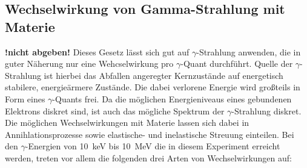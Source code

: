 \subsection{Wechselwirkung von Gamma-Strahlung mit Materie}
\textbf{!nicht abgeben!}
Dieses Gesetz lässt sich gut auf $\gamma$-Strahlung anwenden, die in guter Näherung
nur eine Wehcselwirkung pro $\gamma$-Quant durchführt. Quelle der $\gamma$-Strahlung ist
hierbei das Abfallen angeregter Kernzustände auf energetisch stabilere, energieärmere
Zustände. Die dabei verlorene Energie wird großteils in Form eines $\gamma$-Quants frei.
Da die möglichen Energieniveaus eines gebundenen Elektrons diskret sind, ist auch das
mögliche Spektrum der $\gamma$-Strahlung diskret. Die möglichen Wechselwirkungen mit Materie
lassen sich dabei in Annihlationsprozesse sowie elastische- und inelastische Streuung
einteilen. Bei den $\gamma$-Energien von
\SI{10}{\kilo\electronvolt} bis \SI{10}{\mega\electronvolt} die in diesem Experiment
erreicht werden, treten vor allem die folgenden drei Arten von Wechselwirkungen auf:
